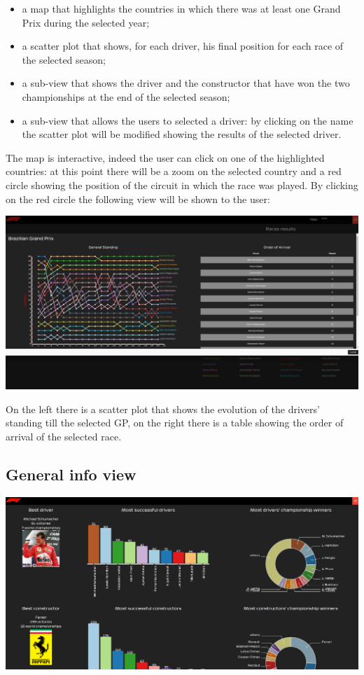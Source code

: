 \documentclass[10pt,twocolumn,letterpaper]{article}
\begin{document}
\begin{itemize}
	\item a map that highlights the countries in which there was at least one Grand Prix during the selected year;
	\item a scatter plot that shows, for each driver, his final position for each race of the selected season;
	\item a sub-view that shows the driver and the constructor that have won the two championships at the end of the selected season;
	\item a sub-view that allows the users to selected a driver: by clicking on the name the scatter plot will be modified showing the results of the selected driver.
\end{itemize}

The map is interactive, indeed the user can click on one of the highlighted countries: at this point there will be a zoom on the selected country and a red circle showing the
position of the circuit in which the race was played. By clicking on the red circle the following view will be shown to the user:

\begin{center}
	\centering
	\includegraphics[width=\columnwidth]{map-clicked}
\end{center}

On the left there is a scatter plot that shows the evolution of the drivers' standing till the selected GP, on the right there is a table showing the order of arrival of the selected
race.

\subsection{General info view}
\begin{center}
	\centering
	\includegraphics[width=\columnwidth]{generalinfo}
\end{center}
\end{document}
